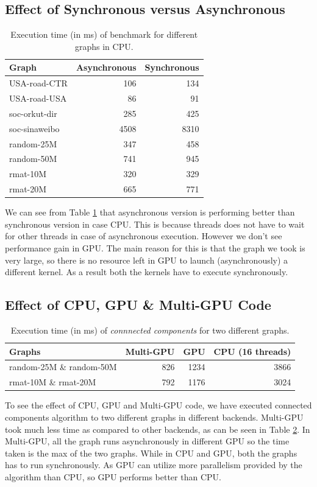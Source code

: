\documentclass[12pt]{article}
\begin{document}
\subsection{Effect of Synchronous versus Asynchronous}\label{expt:syncasync}
\begin{table}
\centering
\begin{tabular}{|l|r|r|}
\hline
\textbf{Graph} & \textbf{Asynchronous}  & \textbf{Synchronous}\\\hline
USA-road-CTR &   106 &   134\\\hline
USA-road-USA &   86 &   91\\\hline
soc-orkut-dir &   285 &   425\\\hline
soc-sinaweibo &   4508 &  8310\\\hline
random-25M &   347 &   458\\\hline
random-50M &   741 &   945\\\hline
rmat-10M &   320 &   329\\\hline
rmat-20M &   665 &   771\\\hline
\end{tabular}
\caption{Execution time (in ms) of benchmark for different graphs in CPU.}
\label{tab:async-cpu}
\end{table}
We can see from Table \ref{tab:async-cpu} that asynchronous version is performing better than synchronous version in case CPU. This is because threads does not have to wait for other threads in case of asynchronous execution. However we don't see performance gain in GPU. The main reason for this is that the graph we took is very large, so there is no resource left in GPU to launch (asynchronously) a different kernel. As a result both the kernels have to execute synchronously.

\subsection{Effect of CPU, GPU \& Multi-GPU Code}\label{expt:cpugpu}
\begin{table}
\centering
\begin{tabular}{|l|r|r|r|}
\hline
\textbf{Graphs} & \textbf{Multi-GPU} & \textbf{GPU} & \textbf{CPU (16 threads)}\\\hline
random-25M \& random-50M & 826  & 1234 & 3866 \\\hline
rmat-10M \& rmat-20M & 792 &  1176 & 3024\\\hline
\end{tabular}
\caption{Execution time (in ms) of \textit{connnected components} for two different graphs.}
\label{tab:multigpu}
\end{table}
To see the effect of CPU, GPU and Multi-GPU code, we have executed connected components algorithm to two different graphs in different backends. Multi-GPU took much less time as compared to other backends, as can be seen in Table \ref{tab:multigpu}. In Multi-GPU, all the graph runs asynchronously in different GPU so the time taken is the max of the two graphs. While in CPU and GPU, both the graphs has to run synchronously. As GPU can utilize more parallelism provided by the algorithm than CPU, so GPU performs better than CPU.
\end{document}
